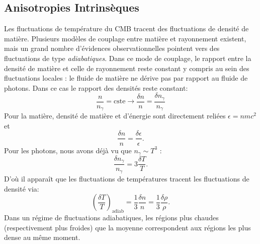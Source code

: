 \subsection{Anisotropies Intrinsèques}
Les fluctuations de température du CMB tracent des fluctuations de densité de matière. Plusieurs modèles de couplage entre matière et rayonnement existent, mais un grand nombre d'évidences observationnelles pointent vers des fluctuations de type \textit{adiabatiques}. Dans ce mode de couplage, le rapport entre la densité de matière et celle de rayonnement reste constant y compris au sein des fluctuations locales : le fluide de matière ne dérive pas par rapport au fluide de photons. Dans ce cas le rapport des densités reste constant:
\begin{equation}
\frac{n}{n_\gamma}=\mathrm{cste}\rightarrow\frac{\delta n}{n}=\frac{\delta n_\gamma}{n_\gamma}
\end{equation}
Pour la matière, densité de matière et d'énergie sont directement reliées $\epsilon=n m c^2$ et
\begin{equation}
\frac{\delta n}{n}=\frac{\delta \epsilon}{\epsilon}.
\end{equation}
Pour les photons, nous avons déjà vu que $n_\gamma \sim T^3$ :
\begin{equation}
\frac{\delta n_\gamma}{n_\gamma}=3 \frac{\delta T}{T}.
\end{equation}
D'où il apparaît que les fluctuations de températures tracent les fluctuations de densité via:
\begin{equation}
\left(\frac{\delta T}{T}\right)_\mathrm{adiab}=\frac{1}{3}\frac{\delta n}{n}=\frac{1}{3}\frac{\delta \rho}{\rho}.
\end{equation}
Dans un régime de fluctuations adiabatiques, les régions plus chaudes (respectivement plus froides) que la moyenne correspondent aux régions les plus dense au même moment. 

